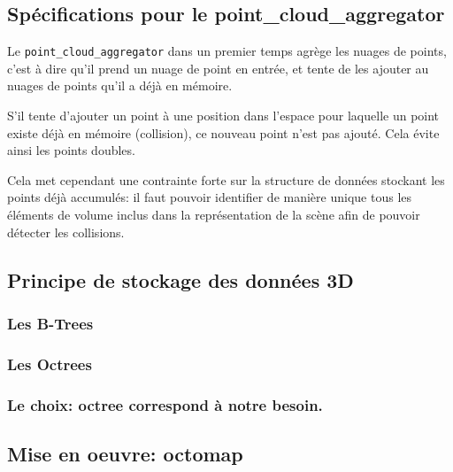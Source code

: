\documentclass[12pt,a4paper]{report}
\begin{document}
		\subsection{Spécifications pour le point\_cloud\_aggregator}
		Le \verb|point_cloud_aggregator| dans un premier temps agrège les nuages de points, c'est à dire qu'il prend un nuage de point en entrée, et tente de les ajouter au nuages de points qu'il a déjà en mémoire. 
		
		\para S'il tente d'ajouter un point à une position dans l'espace pour laquelle un point existe déjà en mémoire (collision), ce nouveau point n'est pas ajouté. Cela évite ainsi les points doubles.
		
		\para Cela met cependant une contrainte forte sur la structure de données stockant les points déjà accumulés: il faut pouvoir identifier de manière unique tous les éléments de volume inclus dans la représentation de la scène afin de pouvoir détecter les collisions.
		
		\subsection{Principe de stockage des données 3D}
		
		\subsubsection{Les B-Trees}
		
		\subsubsection{Les Octrees}
		
		\subsubsection{Le choix: octree correspond à notre besoin.}
		
		\subsection{Mise en oeuvre: octomap}
		
\end{document}
